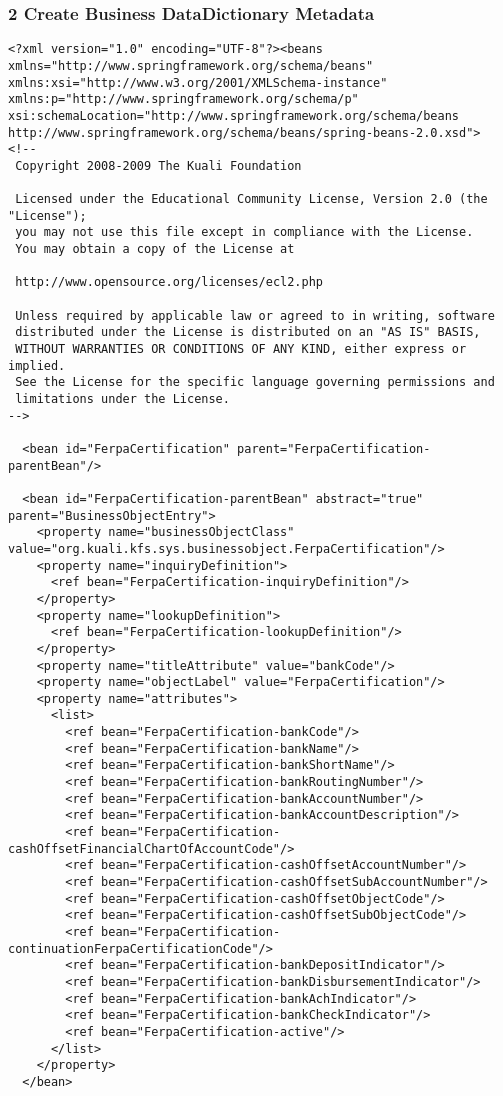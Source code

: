 \subsubsection*{2 Create Business DataDictionary Metadata}
\begin{verbatim}
<?xml version="1.0" encoding="UTF-8"?><beans xmlns="http://www.springframework.org/schema/beans" xmlns:xsi="http://www.w3.org/2001/XMLSchema-instance" xmlns:p="http://www.springframework.org/schema/p" xsi:schemaLocation="http://www.springframework.org/schema/beans         http://www.springframework.org/schema/beans/spring-beans-2.0.xsd">
<!--
 Copyright 2008-2009 The Kuali Foundation
 
 Licensed under the Educational Community License, Version 2.0 (the "License");
 you may not use this file except in compliance with the License.
 You may obtain a copy of the License at
 
 http://www.opensource.org/licenses/ecl2.php
 
 Unless required by applicable law or agreed to in writing, software
 distributed under the License is distributed on an "AS IS" BASIS,
 WITHOUT WARRANTIES OR CONDITIONS OF ANY KIND, either express or implied.
 See the License for the specific language governing permissions and
 limitations under the License.
-->

  <bean id="FerpaCertification" parent="FerpaCertification-parentBean"/>

  <bean id="FerpaCertification-parentBean" abstract="true" parent="BusinessObjectEntry">
    <property name="businessObjectClass" value="org.kuali.kfs.sys.businessobject.FerpaCertification"/>
    <property name="inquiryDefinition">
      <ref bean="FerpaCertification-inquiryDefinition"/>
    </property>
    <property name="lookupDefinition">
      <ref bean="FerpaCertification-lookupDefinition"/>
    </property>
    <property name="titleAttribute" value="bankCode"/>
    <property name="objectLabel" value="FerpaCertification"/>
    <property name="attributes">
      <list>
        <ref bean="FerpaCertification-bankCode"/>
        <ref bean="FerpaCertification-bankName"/>
        <ref bean="FerpaCertification-bankShortName"/>
        <ref bean="FerpaCertification-bankRoutingNumber"/>
        <ref bean="FerpaCertification-bankAccountNumber"/>
        <ref bean="FerpaCertification-bankAccountDescription"/>
        <ref bean="FerpaCertification-cashOffsetFinancialChartOfAccountCode"/>
        <ref bean="FerpaCertification-cashOffsetAccountNumber"/>
        <ref bean="FerpaCertification-cashOffsetSubAccountNumber"/>
        <ref bean="FerpaCertification-cashOffsetObjectCode"/>
        <ref bean="FerpaCertification-cashOffsetSubObjectCode"/>
        <ref bean="FerpaCertification-continuationFerpaCertificationCode"/>
        <ref bean="FerpaCertification-bankDepositIndicator"/>
        <ref bean="FerpaCertification-bankDisbursementIndicator"/>
        <ref bean="FerpaCertification-bankAchIndicator"/>
        <ref bean="FerpaCertification-bankCheckIndicator"/>
        <ref bean="FerpaCertification-active"/>
      </list>
    </property>
  </bean>


\end{verbatim}
